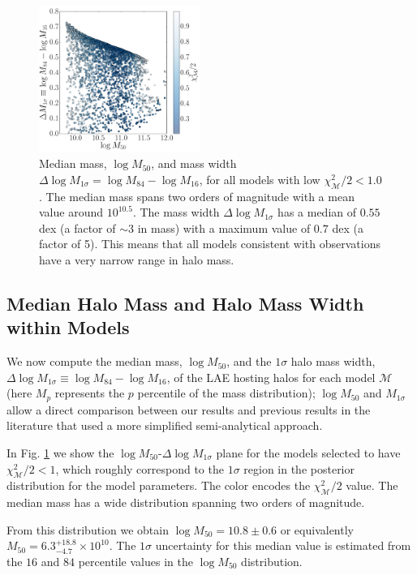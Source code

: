 \documentclass{emulateapj}
\newcommand{\hMsun}{{\ifmmode{h^{-1}{\rm {M_{\odot}}}}\else{$h^{-1}{\rm{M_{\odot}}}$}\fi}}
\begin{document}
\begin{figure}
\includegraphics[width=0.47\textwidth]{fig4.pdf}
\caption{Median mass, $\log M_{50}$, and mass width $\Delta \log
  M_{1\sigma}=\log M_{84} - \log M_{16}$, for all models with low
  $\chi^2_{\mathcal{M}}/2 < 1.0$. 
  The median mass spans two orders of magnitude with a mean value
  around $10^{10.5}$\hMsun.   
  The mass width $\Delta \log M_{1\sigma}$ has a median of $0.55$ dex (a factor
  of $\sim3$ in mass) with a maximum value of $0.7$ dex (a factor of
  5). This means that all models consistent with observations have a
  very narrow range in halo mass.}
\label{fig:mmed}
\end{figure}

\subsection{Median Halo Mass and Halo Mass Width within Models}

We now compute the median mass, $\log M_{50}$, and the $1\sigma$ halo mass
width, $\Delta \log M_{1\sigma} \equiv \log M_{84} - \log M_{16}$, of the
LAE hosting halos for each model  $\mathcal{M}$ (here $M_{p}$
represents the $p$ percentile of the mass distribution); $\log M_{50}$
and $M_{1\sigma}$ allow a direct comparison between our results and
previous results in the literature
\citep[e.g.][]{Hayashino2004,Gawiser2007,Ouchi2010,Bielby16} that used
a more simplified semi-analytical approach. 

In Fig. \ref{fig:mmed} we show the $\log M_{50}$-$\Delta \log M_{1\sigma}$
plane for the models selected to have $\chi^{2}_{\mathcal{M}}/2 < 1$,
which roughly correspond to the $1\sigma$ region in the posterior
distribution for the model parameters. The color encodes the
$\chi^{2}_{\mathcal{M}}/2$ value. The median mass has a wide distribution
spanning two orders of magnitude.

From this distribution we obtain $\log M_{50} = 10.8\pm 0.6$ or
equivalently $M_{50} = 6.3^{+18.8}_{-4.7}\times 10^{10}$\hMsun.  
The $1\sigma$ uncertainty for this median value is estimated from the
$16$ and $84$ percentile values in the $\log M_{50}$ distribution.  
\end{document}
